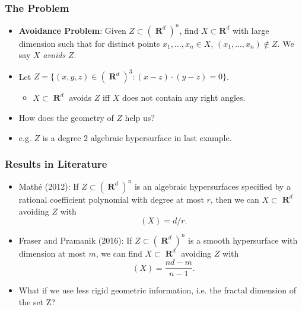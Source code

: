 \documentclass[usenames,dvipsnames,handout]{beamer}
\DeclareMathOperator{\RR}{\textbf{R}}
\DeclareMathOperator{\QQ}{\textbf{Q}}
\DeclareMathOperator{\ZZ}{\textbf{Z}}
\DeclareMathOperator{\hausdim}{\text{dim}_{\textbf{H}}}
\begin{document}
\begin{frame}
    \frametitle{The Problem}

    \begin{itemize}
        \item {\bf Avoidance Problem}: Given $Z \subset (\RR^d)^n$, find $X \subset \mathbf{R}^d$ with large dimension such that for distinct points $x_1, \dots, x_n \in X$, $(x_1, \dots, x_n) \not \in Z$. We say $X$ \emph{avoids} $Z$.

        \pause
        \item Let $Z = \{ (x,y,z) \in (\RR^d)^3: (x - z) \cdot (y - z) = 0 \}$.
        \begin{itemize}
            \item $X \subset \RR^d$ avoids $Z$ iff $X$ does not contain any right angles.
        \end{itemize}


        \pause
        \item How does the geometry of $Z$ help us?

        \pause
        \item e.g. $Z$ is a degree $2$ algebraic hypersurface in last example.
    \end{itemize}
\end{frame}




\begin{frame}
    \frametitle{Results in Literature}

    \begin{itemize}
        \pause
        \item Math\'{e} (2012): If $Z \subset (\RR^d)^n$ is an algebraic hypersurfaces specified by a rational coefficient polynomial with degree at most $r$, then we can $X \subset \RR^d$ avoiding $Z$ with
        \[ \hausdim(X) = d/r. \]

        \pause
        \item Fraser and Pramanik (2016): If $Z \subset (\RR^d)^n$ is a smooth hypersurface with dimension at most $m$, we can find $X \subset \RR^d$ avoiding $Z$ with
        \[ \hausdim(X) = \frac{nd-m}{n-1}. \]

        \pause
        \item What if we use less rigid geometric information, i.e. the fractal dimension of the set Z?
    \end{itemize}
\end{frame}
\end{document}
